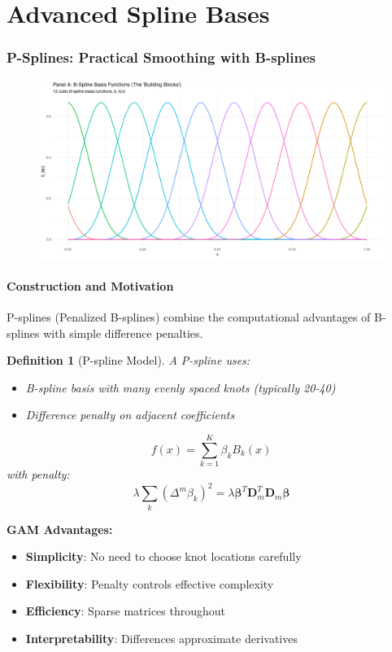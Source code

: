 \documentclass[12pt]{article}
\newtheorem{definition}{Definition}
\begin{document}
\part{Advanced Spline Bases}

\section{P-Splines: Practical Smoothing with B-splines}

\begin{figure}
    \centering
    \includegraphics[width=0.5 \linewidth]{overviews//GAM-theory/b-splines.png}
\end{figure}


\subsection{Construction and Motivation}

P-splines (Penalized B-splines) combine the computational advantages of B-splines with simple difference penalties.

\begin{definition}[P-spline Model]
A P-spline uses:
\begin{itemize}
    \item B-spline basis with many evenly spaced knots (typically 20-40)
    \item Difference penalty on adjacent coefficients
\end{itemize}
\begin{equation}
f(x) = \sum_{k=1}^K \beta_k B_k(x)
\end{equation}
with penalty:
\begin{equation}
\lambda \sum_{k} (\Delta^m \beta_k)^2 = \lambda \bm{\beta}^T \mathbf{D}_m^T \mathbf{D}_m \bm{\beta}
\end{equation}
\end{definition}

\textbf{GAM Advantages:}
\begin{itemize}
    \item \textbf{Simplicity}: No need to choose knot locations carefully
    \item \textbf{Flexibility}: Penalty controls effective complexity
    \item \textbf{Efficiency}: Sparse matrices throughout
    \item \textbf{Interpretability}: Differences approximate derivatives
\end{itemize}
\end{document}
